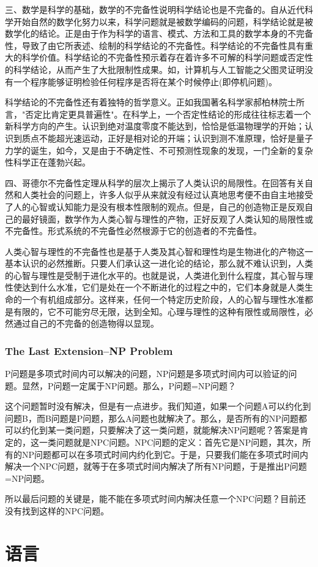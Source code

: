 \documentclass{ctexart}
\begin{document}
	三、数学是科学的基础，数学的不完备性说明科学结论也是不完备的。自从近代科学开始自然的数学化努力以来，科学问题就是被数学编码的问题，科学结论就是被数学化的结论。正是由于作为科学的语言、模式、方法和工具的数学本身的不完备性，导致了由它所表述、绘制的科学结论的不完备性。科学结论的不完备性具有重大的科学价值。科学结论的不完备性预示着存在着许多不可解的科学问题或否定性的科学结论，从而产生了大批限制性成果。如，计算机与人工智能之父图灵证明没有一个程序能够证明检验任何程序是否将在某个时候停止(即停机问题)。
	
	科学结论的不完备性还有着独特的哲学意义。正如我国著名科学家郝柏林院士所言，"否定比肯定更具普遍性"。在科学上，一个否定性结论的形成往往标志着一个新科学方向的产生。认识到绝对温度零度不能达到，恰恰是低温物理学的开始；认识到质点不能超光速运动，正好是相对论的开端；认识到测不准原理，恰好是量子力学的诞生，如今，又是由于不确定性、不可预测性现象的发现，一门全新的复杂性科学正在蓬勃兴起。
	
	四、哥德尔不完备性定理从科学的层次上揭示了人类认识的局限性。在回答有关自然和人类社会的问题上，许多人似乎从来就没有经过认真地思考便不由自主地接受了人的心智或认知能力是没有根本性限制的观点。但是，自己的创造物正是反观自己的最好镜面，数学作为人类心智与理性的产物，正好反观了人类认知的局限性或不完备性。形式系统的不完备性必然根源于它的创造者的不完备性。
	
	人类心智与理性的不完备性也是基于人类及其心智和理性均是生物进化的产物这一基本认识的必然推断。只要人们承认这一进化论的结论，那么就不难认识到，人类的心智与理性是受制于进化水平的。也就是说，人类进化到什么程度，其心智与理性使达到什么水准，它们是处在一个不断进化的过程之中的，它们本身就是人类生命的一个有机组成部分。这样来，任何一个特定历史阶段，人的心智与理性水准都是有限的，它不可能穷尽无限，达到全知。心理与理性的这种有限性或局限性，必然通过自己的不完备的创造物得以显现。
	\subsubsection{The Last Extension--NP Problem}
	P问题是多项式时间内可以解决的问题，NP问题是多项式时间内可以验证的问题。显然，P问题一定属于NP问题。那么，P问题=NP问题？
	
	这个问题暂时没有解决，但是有一点进步。我们知道，如果一个问题A可以约化到问题B，而B问题是P问题，那么A问题也就解决了。那么，是否所有的NP问题都可以约化到某一类问题，只要解决了这一类问题，就能解决NP问题呢？答案是肯定的，这一类问题就是NPC问题。NPC问题的定义：首先它是NP问题，其次，所有的NP问题都可以在多项式时间内约化到它。于是，只要我们能在多项式时间内解决一个NPC问题，就等于在多项式时间内解决了所有NP问题，于是推出P问题=NP问题。
	
	所以最后问题的关键是，能不能在多项式时间内解决任意一个NPC问题？目前还没有找到这样的NPC问题。
	\section{语言}
	
\end{document}
